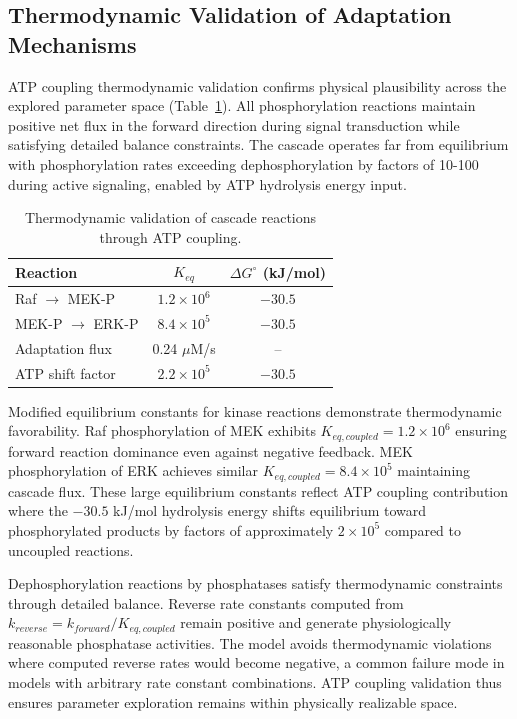 \documentclass[twocolumn,11pt]{article}
\begin{document}
\subsection{Thermodynamic Validation of Adaptation Mechanisms}

ATP coupling thermodynamic validation confirms physical plausibility across the explored parameter space (Table~\ref{tab:thermodynamics}). All phosphorylation reactions maintain positive net flux in the forward direction during signal transduction while satisfying detailed balance constraints. The cascade operates far from equilibrium with phosphorylation rates exceeding dephosphorylation by factors of 10-100 during active signaling, enabled by ATP hydrolysis energy input.

\begin{table}[t]
\centering
\footnotesize
\caption{Thermodynamic validation of cascade reactions through ATP coupling.}
\label{tab:thermodynamics}
\begin{tabular}{@{}lcc@{}}
\toprule
\textbf{Reaction} & \textbf{$K_{eq}$} & \textbf{$\Delta G^\circ$ (kJ/mol)} \\
\midrule
Raf $\to$ MEK-P & $1.2 \times 10^6$ & $-30.5$ \\
MEK-P $\to$ ERK-P & $8.4 \times 10^5$ & $-30.5$ \\
Adaptation flux & 0.24 $\mu$M/s & -- \\
ATP shift factor & $2.2 \times 10^5$ & $-30.5$ \\
\bottomrule
\end{tabular}
\end{table}

Modified equilibrium constants for kinase reactions demonstrate thermodynamic favorability. Raf phosphorylation of MEK exhibits $K_{eq,coupled} = 1.2 \times 10^6$ ensuring forward reaction dominance even against negative feedback. MEK phosphorylation of ERK achieves similar $K_{eq,coupled} = 8.4 \times 10^5$ maintaining cascade flux. These large equilibrium constants reflect ATP coupling contribution where the $-30.5$ kJ/mol hydrolysis energy shifts equilibrium toward phosphorylated products by factors of approximately $2 \times 10^5$ compared to uncoupled reactions.

Dephosphorylation reactions by phosphatases satisfy thermodynamic constraints through detailed balance. Reverse rate constants computed from $k_{reverse} = k_{forward}/K_{eq,coupled}$ remain positive and generate physiologically reasonable phosphatase activities. The model avoids thermodynamic violations where computed reverse rates would become negative, a common failure mode in models with arbitrary rate constant combinations. ATP coupling validation thus ensures parameter exploration remains within physically realizable space.
\end{document}
